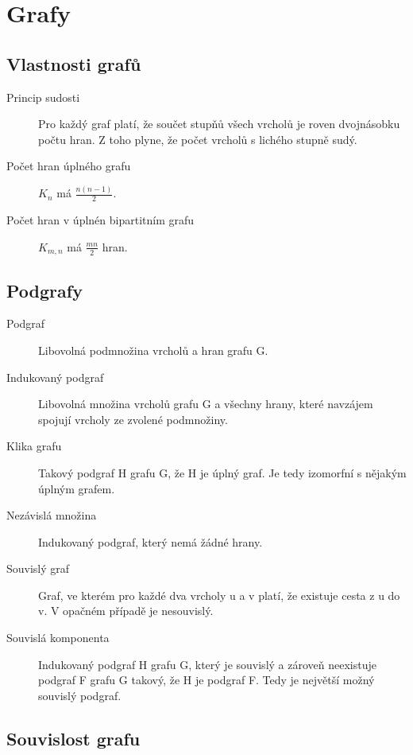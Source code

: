 \section{Grafy}

  \subsection{Vlastnosti grafů}
    \begin{description}
       \item[Princip sudosti] Pro každý graf platí, že součet stupňů všech vrcholů je roven dvojnásobku počtu hran. Z toho plyne, že počet vrcholů s lichého stupně sudý.
       \item[Počet hran úplného grafu] $K_n$ má $\frac{n(n-1)}{2}$.
       \item[Počet hran v úplnén bipartitním grafu] $K_{m,n}$ má $\frac{mn}{2}$ hran.
    \end{description}

  \subsection{Podgrafy}

    \begin{description}
      \item[Podgraf] Libovolná podmnožina vrcholů a hran grafu G.
      \item[Indukovaný podgraf] Libovolná množina vrcholů grafu G a všechny hrany, které navzájem spojují vrcholy ze zvolené podmnožiny.
      \item[Klika grafu] Takový podgraf H grafu G, že H je úplný graf. Je tedy izomorfní s nějakým úplným grafem.
      \item[Nezávislá množina] Indukovaný podgraf, který nemá žádné hrany.
      \item[Souvislý graf] Graf, ve kterém pro každé dva vrcholy u a v platí, že existuje cesta z u do v. V opačném případě je nesouvislý.
      \item[Souvislá komponenta] Indukovaný podgraf H grafu G, který je souvislý a zároveň neexistuje podgraf F grafu G takový, že H je podgraf F. Tedy je největší možný souvislý podgraf.
    \end{description}

  \subsection{Souvislost grafu}

